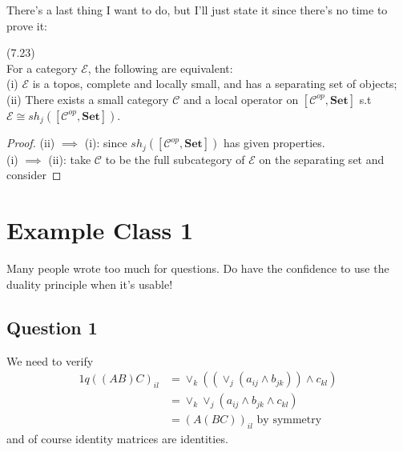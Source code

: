 \documentclass[a4paper]{article}
\begin{document}
There's a last thing I want to do, but I'll just state it since there's no time to prove it:
\begin{thm} (7.23)\\
    For a category $\mathcal{E}$, the following are equivalent:\\
    (i) $\mathcal{E}$ is a topos, complete and locally small, and has a separating set of objects;\\
    (ii) There exists a small category $\mathcal{C}$ and a local operator on $[\mathcal{C}^{op},\mathbf{Set}]$ s.t $\mathcal{E} \cong sh_j([\mathcal{C}^{op},\mathbf{Set}])$.
    \begin{proof}
        (ii) $\implies$ (i): since $sh_j([\mathcal{C}^{op},\mathbf{Set}])$ has given properties.\\
        (i) $\implies$ (ii): take $\mathcal{C}$ to be the full subcategory of $\mathcal{E}$ on the separating set and consider
    \end{proof}
\end{thm}

\newpage

\section{Example Class 1}
Many people wrote too much for questions. Do have the confidence to use the duality principle when it's usable!

\subsection{Question 1}
We need to verify
\begin{equation*}
    \begin{aligned}1q
        ((AB)C)_{il} &= \vee_k ((\vee_j (a_{ij} \wedge b_{jk} )) \wedge c_{kl})\\
        &= \vee_k \vee_j (a_{ij} \wedge b_{jk} \wedge c_{kl})\\
        &= (A(BC))_{il} \text{ by symmetry}
    \end{aligned}
\end{equation*}
and of course identity matrices are identities.
\end{document}
